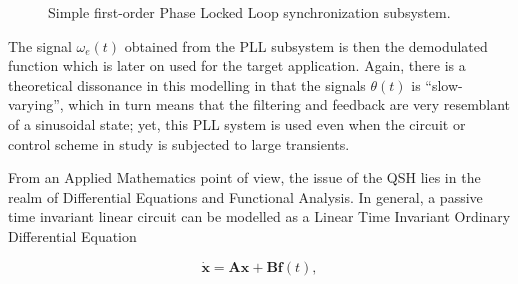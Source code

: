 \begin{figure}
\caption{Simple first-order Phase Locked Loop synchronization subsystem.}
\label{fig:example_pll}
\end{figure}

	The signal $\omega_e(t)$ obtained from the PLL subsystem is then the demodulated function which is later on used for the target application. Again, there is a theoretical dissonance in this modelling in that the signals $\theta(t)$ is ``slow-varying'', which in turn means that the filtering and feedback are very resemblant of a sinusoidal state; yet, this PLL system is used even when the circuit or control scheme in study is subjected to large transients.

	From an Applied Mathematics point of view, the issue of the QSH lies in the realm of Differential Equations and Functional Analysis. In general, a passive time invariant linear circuit can be modelled as a Linear Time Invariant Ordinary Differential Equation

\begin{equation} \dot{\mathbf{x}} = \mathbf{Ax + Bf}(t), \label{eq:lincircuit_ode_general}\end{equation}

